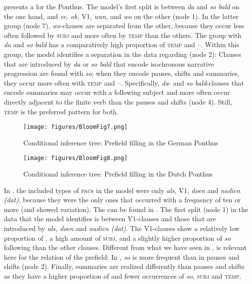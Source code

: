 \documentclass[output=paper,colorlinks,citecolor=brown]{langscibook}
\begin{document}
 presents a  for the  Ponthus. The model's first split is between \textit{da} and \textit{so bald} on the one hand, and \textit{ee, ob,} V1, \textit{wan,} and \textit{wo} on the other (node 1). In the latter group (node 7), \textit{wo-}clauses are separated from the other, because they occur less often followed by \textsc{subj} and more often by \textsc{temp} than the others. The group with \textit{da} and \textit{so bald} has a comparatively high proportion of \textsc{temp} and {--}. Within this group, the model identifies a separation in the data regarding  (node 2): Clauses that are introduced by \textit{da} or \textit{so bald} that encode isochronous narrative progression are found with \textit{so}; when they encode pauses, shifts and summaries, they occur more often with \textsc{temp} and --. Specifically, \textit{da}- and \textit{so bald}-clauses that encode summaries may occur with a following subject and more often occur directly adjacent to the finite verb than the pauses and shifts (node 4). Still, \textsc{temp} is the preferred pattern for both.

\begin{sidewaysfigure}[p]
\caption{Conditional inference tree: Prefield filling in the German Ponthus}\label{fig:GE5}
	\texttt{[image: figures/BloomFig7.png]}
\end{sidewaysfigure}

\begin{sidewaysfigure}[p]
\caption{Conditional inference tree: Prefield filling in the Dutch Ponthus}\label{fig:NL5}
	\texttt{[image: figures/BloomFig8.png]}
\end{sidewaysfigure}

In , the included types of \textsc{pac}s in the model were only \textit{als,} V1, \textit{doen} and \textit{nadien (dat)}, because they were the only ones that occurred with a frequency of ten or more (and showed variation). The  can be found in . The first split (node 1) in the data that the model identifies is between V1-clauses and those that are introduced by \textit{als, doen} and \textit{nadien (dat)}. The V1-clauses show a relatively low proportion of , a high amount of \textsc{subj}, and a slightly higher proportion of \textit{so} following than the other clauses. Different from what we have seen in ,  is relevant here for the relation of the prefield: In , \textit{so} is more frequent than in pauses and shifts (node 2). Finally, summaries are realized differently than pauses and shifts as they have a higher proportion of  and fewer occurrences of \textit{so}, \textsc{subj} and \textsc{temp}.
\end{document}
